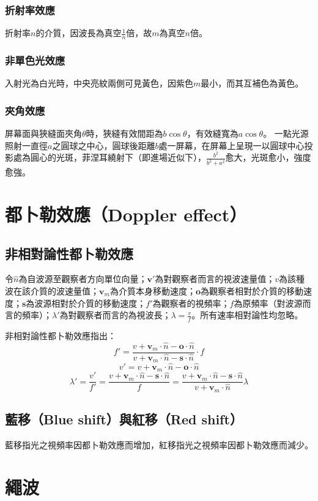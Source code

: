 \documentclass[a4paper,12pt]{report}
\begin{document}
\subsubsection{折射率效應}
折射率$n$的介質，因波長為真空$\frac{1}{n}$倍，故$m$為真空$n$倍。
\subsubsection{非單色光效應}
入射光為白光時，中央亮紋兩側可見黃色，因紫色$m$最小，而其互補色為黃色。
\subsubsection{夾角效應}
屏幕面與狹縫面夾角$\theta$時，狹縫有效間距為$b\cos\theta$，有效縫寬為$a\cos\theta$。
一點光源照射一直徑$a$之圓球之中心，圓球後距離$b$處一屏幕，在屏幕上呈現一以圓球中心投影處為圓心的光斑，菲涅耳繞射下（即進場近似下），$\frac{b^2}{b^2+a^2}$愈大，光斑愈小，強度愈強。


\section{都卜勒效應（Doppler effect）}
\subsection{非相對論性都卜勒效應}
令$\hat{n}$為自波源至觀察者方向單位向量；$\mathbf{v}'$為對觀察者而言的視波速量值；$v$為該種波在該介質的波速量值；$\mathbf{v}_m$為介質本身移動速度；$\mathbf{o}$為觀察者相對於介質的移動速度；$\mathbf{s}$為波源相對於介質的移動速度；$f'$為觀察者的視頻率；$f$為原頻率（對波源而言的頻率）；$\lambda'$為對觀察者而言的為視波長；$\lambda=\frac{v}{f}$。所有速率相對論性均忽略。

非相對論性都卜勒效應指出：
\[f'=\frac{v+\mathbf{v}_m\cdot\hat{n}-\mathbf{o}\cdot\hat{n}}{v+\mathbf{v}_m\cdot\hat{n}-\mathbf{s}\cdot\hat{n}}\cdot f\]
\[v'=v+\mathbf{v}_m\cdot\hat{n}-\mathbf{o}\cdot\hat{n}\]
\[\lambda'=\frac{v'}{f'}=\frac{v+\mathbf{v}_m\cdot\hat{n}-\mathbf{s}\cdot\hat{n}}{f}=\frac{v+\mathbf{v}_m\cdot\hat{n}-\mathbf{s}\cdot\hat{n}}{v+\mathbf{v}_m\cdot\hat{n}}\lambda\]
\subsection{藍移（Blue shift）與紅移（Red shift）}
藍移指光之視頻率因都卜勒效應而增加，紅移指光之視頻率因都卜勒效應而減少。


\section{繩波}
\end{document}
